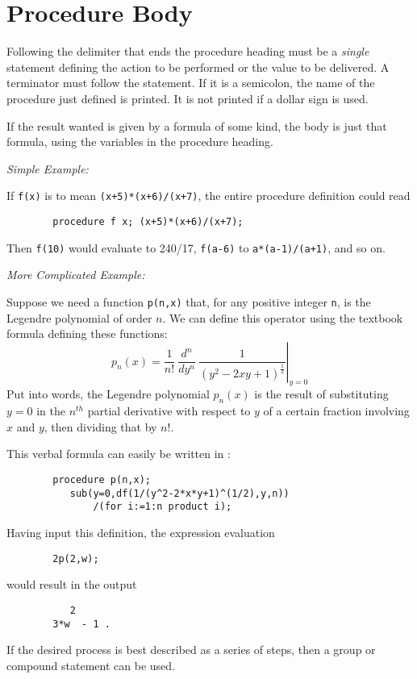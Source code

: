 \section{Procedure Body}

Following the delimiter that ends the procedure heading must be a 
\emph{single} statement defining the action to be performed or the value to be
delivered.  A terminator must follow the statement.  If it is a semicolon,
the name of the procedure just defined is printed.  It is not printed if a
dollar sign is used.

If the result wanted is given by a formula of some kind, the body is just
that formula, using the variables in the procedure heading.

\textit{Simple Example:}

If \texttt{f(x)} is to mean \texttt{(x+5)*(x+6)/(x+7)}, the entire procedure
definition could read
\begin{verbatim}
        procedure f x; (x+5)*(x+6)/(x+7);
\end{verbatim}
Then \texttt{f(10)} would evaluate to 240/17, \texttt{f(a-6)} to
\texttt{a*(a-1)/(a+1)}, and so on.

\textit{More Complicated Example:}

Suppose we need a function \texttt{p(n,x)} that, for any positive integer
\texttt{n}, is the Legendre polynomial of order
$n$. We can define this operator using the
textbook formula defining these functions:
\[
p_n(x) = \left.\frac{1}{n!}\  
\frac{{d}^n}{dy^n}\ \frac{1}{{(y^2 - 2xy + 1)}^{\frac{1}{2}}}\right\vert_{y=0}
\]
Put into words, the Legendre polynomial $p_n(x)$ is the result of
substituting $y=0$ in the $n^{th}$ partial derivative with respect to $y$
of a certain fraction involving $x$ and $y$, then dividing that by $n!$.

This verbal formula can easily be written in {\REDUCE}:
\begin{verbatim}
        procedure p(n,x);
           sub(y=0,df(1/(y^2-2*x*y+1)^(1/2),y,n))
               /(for i:=1:n product i);
\end{verbatim}
Having input this definition, the expression evaluation
\begin{verbatim}
        2p(2,w);
\end{verbatim}
would result in the output
\begin{verbatim}
           2
        3*w  - 1 .
\end{verbatim}
If the desired process is best described as a series of steps, then a group
or compound statement can be used.

